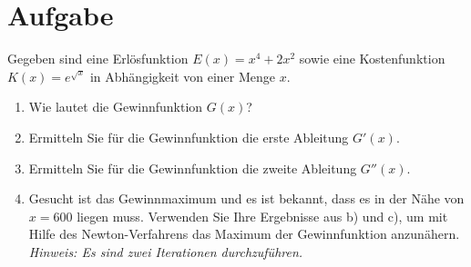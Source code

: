 \documentclass[fontsize=11pt, parskip=half]{scrartcl}
\begin{document}
\section{Aufgabe}Gegeben sind eine Erlösfunktion $\displaystyle E(x)=x^4+2x^2$
sowie eine Kostenfunktion $\displaystyle K(x)=e^{\sqrt{x}}$ in
Abhängigkeit von einer Menge $x$.


\begin{enumerate}
 \item Wie lautet die Gewinnfunktion $\displaystyle G(x)$?
 \item Ermitteln Sie für die Gewinnfunktion die erste Ableitung $\displaystyle G'(x)$.
 \item Ermitteln Sie für die Gewinnfunktion die zweite Ableitung $\displaystyle G''(x)$.
 \item Gesucht ist das Gewinnmaximum und es ist bekannt, dass es in der Nähe von $x=600$ liegen muss. Verwenden Sie Ihre Ergebnisse
 aus b) und c), um mit Hilfe des Newton-Verfahrens das Maximum der
 Gewinnfunktion anzunähern.\\
 \emph{Hinweis: Es sind zwei Iterationen durchzuführen.}\\
\end{enumerate}
\end{document}
